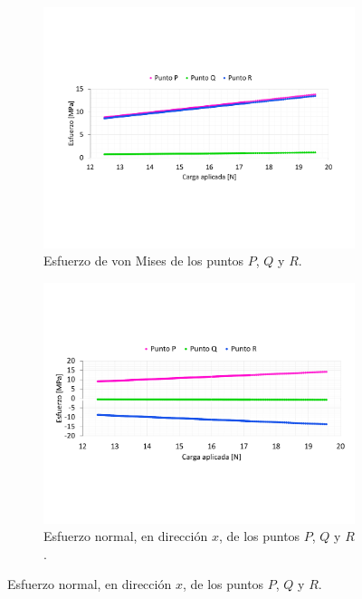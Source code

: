\begin{figure}[p]
\centering
	\begin{subfigure}{1\linewidth}
		\centering
		\includegraphics[width=\linewidth, trim={1cm 5cm 0cm 5cm},clip]{Imagenes/esf_vm.pdf}
		\caption{Esfuerzo de von Mises de los puntos $P$, $Q$ y $R$.}
		\label{fig:esf_vm201}
	\end{subfigure}
	\begin{subfigure}{1\linewidth}
		\centering
		\includegraphics[width=\linewidth, trim={1cm 5cm 0cm 5cm},clip]{Imagenes/esf_normal.pdf}
		\caption{Esfuerzo normal, en dirección $x$, de los puntos $P$, $Q$ y $R$.}
		\label{fig:esf_normal201}
	\end{subfigure}

\end{figure}
